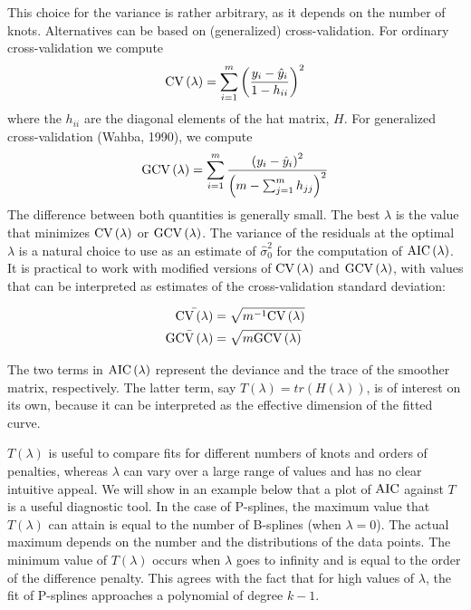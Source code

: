 \documentclass[12pt]{article}
\newcommand*\needsparaphrased{\color{red}}
\begin{document}
{\needsparaphrased This choice for the variance is rather arbitrary, as it depends on the number of knots. Alternatives can be based on (generalized) cross-validation. For ordinary cross-validation we compute}
\begin{equation} \label{eq:univariate_CV}
\textup{CV}\left(\lambda\right) = \sum_{i=1}^m \left( \frac{ y_i - \hat{y}_i }{1-h_{ii}}\right)^2 
\end{equation}
{\needsparaphrased where the $h_{ii}$ are the diagonal elements of the hat matrix, $H$. For generalized cross-validation (Wahba, 1990), we compute }
\begin{equation} \label{eq:univariate_GCV}
\textup{GCV}\left(\lambda\right) = \sum_{i=1}^m \frac{\left(  y_i - \hat{y}_i \right)^2}{\left(m-\sum_{j=1}^m h_{jj}\right)^2} 
\end{equation}
{\needsparaphrased The difference between both quantities is generally small. The best $\lambda$ is the value that minimizes $\textup{CV}\left(\lambda\right)$ or $\textup{GCV}\left(\lambda\right) $. The variance of the residuals at the optimal $\lambda$ is a natural choice to use as an estimate of $\hat{\sigma}_0^2$ for the computation of $\textup{AIC}\left(\lambda\right)$. It is practical to work with modified versions of $\textup{CV}\left(\lambda\right)$ and $\textup{GCV}\left(\lambda\right)$, with values that can be interpreted as estimates of the cross-validation standard deviation:}

\begin{equation}
\begin{split}
\bar{\textup{CV}\left(\lambda\right)} &= \sqrt{m^{-1}\textup{CV}\left(\lambda\right)} \\
\bar{\textup{GCV}\left(\lambda\right)} &= \sqrt{m\textup{GCV}\left(\lambda\right)} \\
\end{split}
\end{equation}

{\needsparaphrased The two terms in $\textup{AIC}\left(\lambda\right)$ represent the deviance and the trace of the smoother matrix, respectively. The latter term, say $T\left(\lambda\right) = tr\left(H\left(\lambda\right)\right)$, is of interest on its own, because it can be interpreted as the effective dimension of the fitted curve.

$T\left(\lambda\right)$ is useful to compare fits for different numbers of knots and orders of penalties, whereas $\lambda$ can vary over a large range of values and has no clear intuitive appeal. We will show in an example below that a plot of $\textup{AIC}$ against $T$ is a useful diagnostic tool. In the case of P-splines, the maximum value that $T\left(\lambda\right)$ can attain is equal to the number of B-splines (when $\lambda = 0$). The actual maximum depends on the number and the distributions of the data points. The minimum value of $T\left(\lambda\right)$ occurs when $\lambda$ goes to infinity and is equal to the order of the difference penalty. This agrees with the fact that for high values of $\lambda$, the fit of P-splines approaches a polynomial of degree $k - 1$.}
\end{document}
